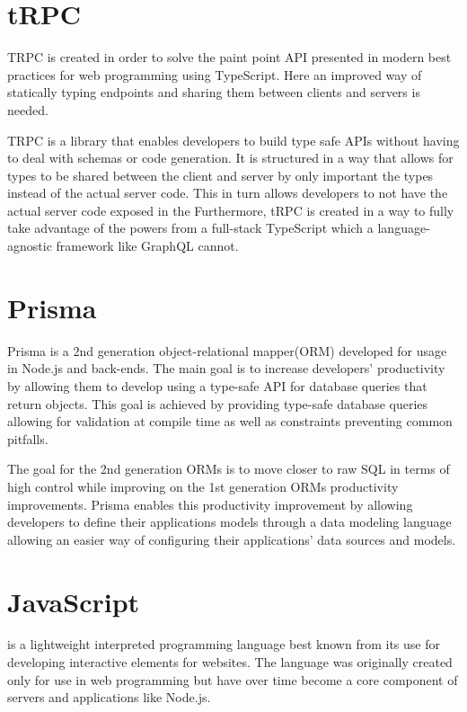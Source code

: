\section{tRPC}
TRPC is created in order to solve the paint point API presented in modern best practices for web programming using TypeScript. 
Here an improved way of statically typing endpoints and sharing them between clients and servers is needed\cite{tRPC}.

TRPC is a library that enables developers to build type safe APIs without having to deal with schemas or code generation. 
It is structured in a way that allows for types to be shared between the client and server by only important the types instead of the actual server code. 
This in turn allows developers to not have the actual server code exposed in the \frontend{} 
Furthermore, tRPC is created in a way to fully take advantage of the powers from a full-stack TypeScript which a language-agnostic framework like GraphQL cannot\cite{tRPC}.

\section{Prisma}
Prisma is a 2nd generation object-relational mapper(ORM) developed for usage in Node.js and \typescript{} back-ends. 
The main goal is to increase developers' productivity by allowing them to develop using a type-safe API for database queries that return \javascript{} objects. 
This goal is achieved by providing type-safe database queries allowing for validation at compile time as well as constraints preventing common pitfalls\cite{Prisma_Why}.

The goal for the 2nd generation ORMs is to move closer to raw SQL in terms of high control while improving on the 1st generation ORMs productivity improvements. 
Prisma enables this productivity improvement by allowing developers to define their applications models through a data modeling language allowing an easier way of configuring their applications' data sources and models\cite{Prisma_Doc}.

\section{JavaScript}
\javascript{} is a lightweight interpreted programming language best known from its use for developing interactive elements for websites\cite{JavaScript_Mozilla}.
The language was originally created only for use in web programming but have over time become a core component of servers and applications like Node.js. 


